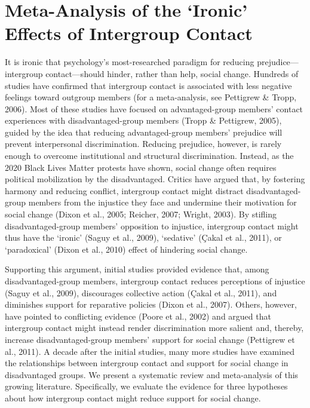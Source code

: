 \documentclass[12pt, letterpaper]{article}
\begin{document}
\newpage

\section{Meta-Analysis of the `Ironic' Effects of Intergroup Contact}

It is ironic that psychology's most-researched paradigm for reducing
prejudice---intergroup contact---should hinder, rather than help, social
change. Hundreds of studies have confirmed that intergroup contact is
associated with less negative feelings toward outgroup members (for a
meta-analysis, see Pettigrew \& Tropp, 2006). Most of these studies have
focused on advantaged-group members' contact experiences with
disadvantaged-group members (Tropp \& Pettigrew, 2005), guided by the
idea that reducing advantaged-group members' prejudice will prevent
interpersonal discrimination. Reducing prejudice, however, is rarely
enough to overcome institutional and structural discrimination. Instead,
as the 2020 Black Lives Matter protests have shown, social change often
requires political mobilization by the disadvantaged. Critics have
argued that, by fostering harmony and reducing conflict, intergroup
contact might distract disadvantaged-group members from the injustice
they face and undermine their motivation for social change (Dixon et
al., 2005; Reicher, 2007; Wright, 2003). By stifling disadvantaged-group
members' opposition to injustice, intergroup contact might thus have the
`ironic' (Saguy et al., 2009), `sedative' (Çakal et al., 2011), or
`paradoxical' (Dixon et al., 2010) effect of hindering social change.

Supporting this argument, initial studies provided evidence that, among
disadvantaged-group members, intergroup contact reduces perceptions of
injustice (Saguy et al., 2009), discourages collective action (Çakal et
al., 2011), and diminishes support for reparative policies (Dixon et
al., 2007). Others, however, have pointed to conflicting evidence (Poore
et al., 2002) and argued that intergroup contact might instead render
discrimination more salient and, thereby, increase disadvantaged-group
members' support for social change (Pettigrew et al., 2011). A decade
after the initial studies, many more studies have examined the
relationships between intergroup contact and support for social change
in disadvantaged groups. We present a systematic review and
meta-analysis of this growing literature. Specifically, we evaluate the
evidence for three hypotheses about how intergroup contact might reduce
support for social change.
\end{document}
